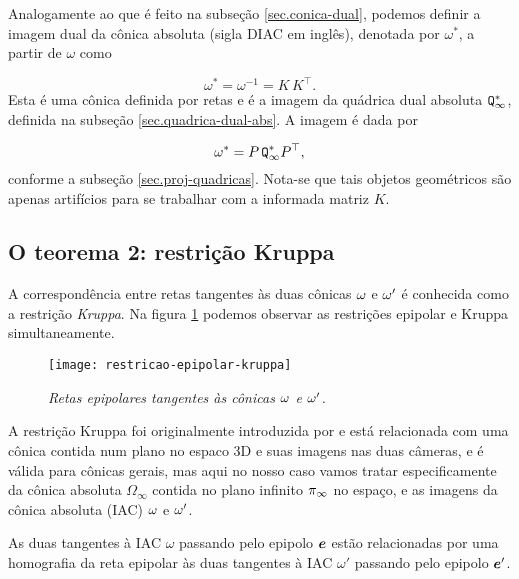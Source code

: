 Analogamente ao que é feito na subseção \ref{sec.conica-dual}, podemos definir a imagem dual da cônica absoluta (sigla DIAC em inglês), denotada por $\omega^*$, a partir de $\omega$ como

\begin{equation*}
\omega^*=\omega^{-1}=K\,K^\top.
\end{equation*}
Esta é uma cônica definida por retas e é a imagem da quádrica dual absoluta ${\tt Q^*_\infty}$, definida na subseção \ref{sec.quadrica-dual-abs}. A imagem é dada por

\begin{equation*}
\omega^*=P\,{\tt Q^*_\infty}P^\top,
\end{equation*}
conforme a subseção \ref{sec.proj-quadricas}. Nota-se que tais objetos geométricos são apenas artifícios para se trabalhar com a informada matriz $K$.

\subsection{O teorema 2: restrição Kruppa}\label{sec.teorema-2}

A correspondência entre retas tangentes às duas cônicas ${\bf \omega}$ e ${\bf \omega'}$ é conhecida como a restrição \textit{Kruppa}. Na figura \ref{epipolar-kruppa} podemos observar as restrições epipolar e Kruppa simultaneamente.

\begin{figure}[!htb]
\centering
\texttt{[image: restricao-epipolar-kruppa]}
\caption{\textit{Retas epipolares tangentes às cônicas ${\bf \omega}$ e ${\bf \omega'}$.}}
\label{epipolar-kruppa}
\end{figure}

A restrição Kruppa foi originalmente introduzida por \cite{faugeras92} e está relacionada com uma cônica contida num plano no espaco 3D e suas imagens nas duas câmeras, e é válida para cônicas gerais, mas aqui no nosso caso vamos tratar especificamente da cônica absoluta $\Omega_\infty$ contida no plano infinito $\pi_\infty$ no espaço, e as imagens da cônica absoluta (IAC) ${\bf \omega}$ e ${\bf \omega'}$.

\begin{teorema}
As duas tangentes à IAC $\omega$ passando pelo epipolo $\boldsymbol{e}$ estão relacionadas por uma homografia da reta epipolar às duas tangentes à IAC $\omega'$ passando pelo epipolo $\boldsymbol{e}'$.
\end{teorema}

